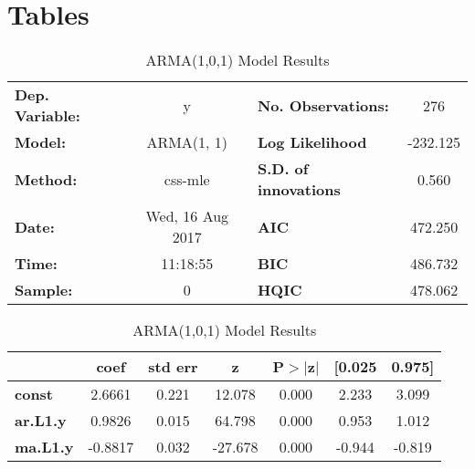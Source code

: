 \clearpage

\squeezeup
\section{Tables}
\squeezeup

\begin{table}[H]
\footnotesize
\caption{ARMA(1,0,1) Model Results}
\label{ARIMA(1,0,1)}
\begin{center}
\begin{tabular}{lclc}
\toprule
\textbf{Dep. Variable:} &            y             & \textbf{  No. Observations:  } &            276             \\
\textbf{Model:}         &        ARMA(1, 1)        & \textbf{  Log Likelihood     } &          -232.125          \\
\textbf{Method:}        &         css-mle          & \textbf{  S.D. of innovations} &           0.560            \\
\textbf{Date:}          &     Wed, 16 Aug 2017     & \textbf{  AIC                } &          472.250           \\
\textbf{Time:}          &         11:18:55         & \textbf{  BIC                } &          486.732           \\
\textbf{Sample:}        &            0             & \textbf{  HQIC               } &          478.062           \\
\bottomrule
\end{tabular}
\begin{tabular}{lcccccc}
                 & \textbf{coef} & \textbf{std err} & \textbf{z} & \textbf{P$>$$|$z$|$} & \textbf{[0.025} & \textbf{0.975]}  \\
\midrule
\textbf{const}   &       2.6661  &        0.221     &    12.078  &         0.000        &        2.233    &        3.099     \\
\textbf{ar.L1.y} &       0.9826  &        0.015     &    64.798  &         0.000        &        0.953    &        1.012     \\
\textbf{ma.L1.y} &      -0.8817  &        0.032     &   -27.678  &         0.000        &       -0.944    &       -0.819     \\
\bottomrule
\end{tabular}
\end{center}
\end{table}

